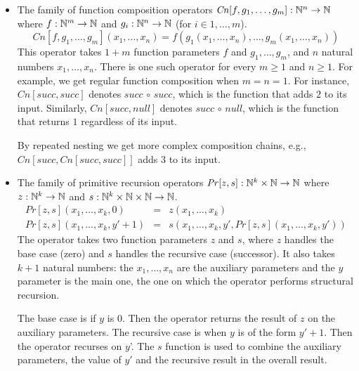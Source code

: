 \begin{itemize}
\item The family of function composition operators $\mathit{Cn}[f,g_1,\ldots,g_m] : \mathbb{N}^n \to \mathbb{N}$
where $f : \mathbb{N}^m \to \mathbb{N}$ and $g_i : \mathbb{N}^n \to \mathbb{N}$ (for $i \in 1,\ldots,m$).
\begin{equation*}
\mathit{Cn}[f,g_1,\ldots,g_m](x_1,\ldots,x_n) = f(g_1(x_1,\ldots,x_n),\ldots,g_m(x_1,\ldots,x_n))
\end{equation*}
This operator takes $1 + m$ function parameters $f$ and $g_1,\ldots,g_m$, and
$n$ natural numbers $x_1,\ldots,x_n$. There is one such operator for every $m
\geq 1$ and $n \geq 1$. For example, we get regular function composition when
$m = n = 1$. For instance, $\mathit{Cn}[\mathit{succ},\mathit{succ}]$ 
denotes $\mathit{succ}\,\circ\,\mathit{succ}$, which is the function that
adds $2$ to its input.
Similarly, $\mathit{Cn}[\mathit{succ},\mathit{null}]$ 
denotes $\mathit{succ}\,\circ\,\mathit{null}$, which is the function that
returns $1$ regardless of its input.

By repeated nesting we get more complex composition chains, e.g., 
$\mathit{Cn}[\mathit{succ},\mathit{Cn}[\mathit{succ},\mathit{succ}]]$
adds $3$ to its input.

\item The family of primitive recursion operators $\mathit{Pr}[z,s] : \mathbb{N}^k \times \mathbb{N} \to \mathbb{N}$
where $z : \mathbb{N}^k \to \mathbb{N}$ and $s : \mathbb{N}^k \times \mathbb{N} \times \mathbb{N} \to \mathbb{N}$.
\begin{eqnarray*}
\mathit{Pr}[z,s](x_1,\ldots,x_k,0) & = & z(x_1,\ldots,x_k) \\
\mathit{Pr}[z,s](x_1,\ldots,x_k,y' + 1) & = & s(x_1,\ldots,x_k,y',\mathit{Pr}[z,s](x_1,\ldots,x_k,y'))
\end{eqnarray*}
The operator takes two function parameters $z$ and $s$, where $z$ handles the base case (zero) and 
$s$ handles the recursive case (successor). It also takes $k + 1$ natural numbers: 
the $x_1,\ldots,x_n$ are the auxiliary parameters and the $y$ parameter is the main one, the one on which
the operator performs structural recursion.

The base case is if $y$ is $0$. Then the operator returns the result of $z$ on the auxiliary parameters.
The recursive case is when $y$ is of the form $y' + 1$. Then the operator recurses on  $y$'.
The $s$ function is used to combine the auxiliary parameters, the value of $y'$ and the recursive
result in the overall result.


\end{itemize}
